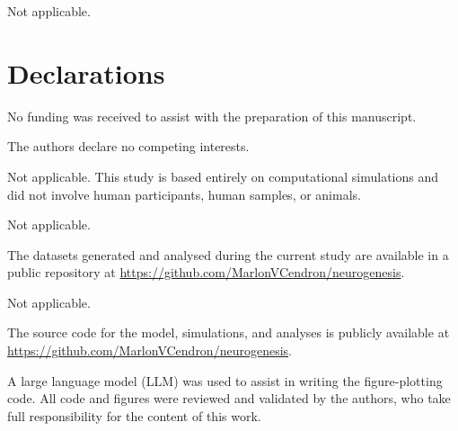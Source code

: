\documentclass[pdflatex,sn-basic]{sn-jnl}%
\theoremstyle{thmstyleone}%
\theoremstyle{thmstyletwo}%
\theoremstyle{thmstylethree}%
\begin{document}

Not applicable.

\section*{Declarations}

No funding was received to assist with the preparation of this manuscript.

The authors declare no competing interests.

Not applicable. This study is based entirely on computational simulations and did not involve human participants, human samples,
or animals.

Not applicable.

The datasets generated and analysed during the current study are available in a public repository at
\url{https://github.com/MarlonVCendron/neurogenesis}.

Not applicable.

The source code for the model, simulations, and analyses is publicly available at
\url{https://github.com/MarlonVCendron/neurogenesis}.

A large language model (LLM) was used to assist in writing the figure-plotting code. All code and figures were reviewed
and validated by the authors, who take full responsibility for the content of this work.


\end{document}
